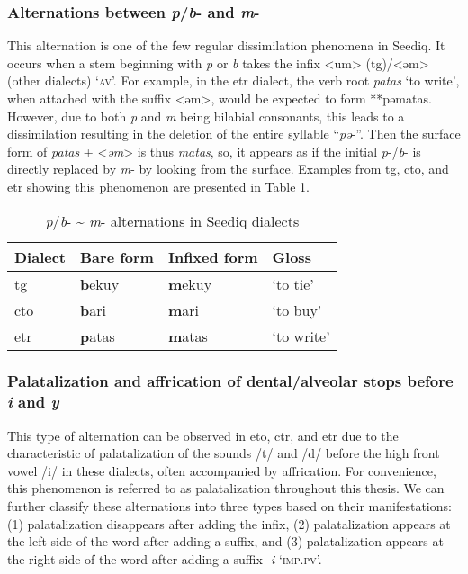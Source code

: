 \subsubsection{Alternations between \textit{p}/\textit{b}- and \textit{m}-} \label{sec:pbm_alter}

This alternation is one of the few regular dissimilation phenomena in Seediq. It occurs when a stem beginning with \textit{p} or \textit{b} takes the infix <um> (\acs{tg})/<əm> (other dialects) `\textsc{av}'. For example, in the \acl{etr} dialect, the verb root \textit{patas} `to write', when attached with the suffix <əm>, would be expected to form **pəmatas. However, due to both \textit{p} and \textit{m} being bilabial consonants, this leads to a dissimilation resulting in the deletion of the entire syllable ``\textit{pə}-''. Then the surface form of \textit{patas} + <\textit{əm}> is thus \textit{matas}, so, it appears as if the initial \textit{p}-/\textit{b}- is directly replaced by \textit{m}- by looking from the surface. Examples from \acl{tg}, \acl{cto}, and \acl{etr} showing this phenomenon are presented in Table \ref{tab:bpm_alt}.

\begin{table}[!htbp]
\centering
\caption{\textit{p}/\textit{b}- \~{} \textit{m}- alternations in Seediq dialects}
\label{tab:bpm_alt}
\begin{tabular}{llll}
\hline
Dialect   & Bare form & Infixed form & Gloss      \\ \hline
\acl{tg}  & \textbf{b}ekuy     & \textbf{m}ekuy        & `to tie'   \\ 
\acl{cto} & \textbf{b}ari      & \textbf{m}ari         & `to buy'   \\
\acl{etr} & \textbf{p}atas     & \textbf{m}atas        & `to write' \\ \hline
\end{tabular}
\end{table}


\subsubsection{Palatalization and affrication of dental/alveolar stops before \textit{i} and \textit{y}}

This type of alternation can be observed in \acl{eto}, \acl{ctr}, and \acl{etr} due to the characteristic of palatalization of the sounds /t/ and /d/ before the high front vowel /i/ in these dialects, often accompanied by affrication. For convenience, this phenomenon is referred to as palatalization throughout this thesis. We can further classify these alternations into three types based on their manifestations: (1) palatalization disappears after adding the infix, (2) palatalization appears at the left side of the word after adding a suffix, and (3) palatalization appears at the right side of the word after adding a suffix -\textit{i} `\textsc{imp.pv}'.

